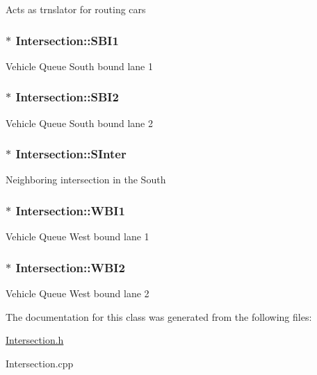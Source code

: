 Acts as trnslator for routing cars \hypertarget{class_intersection_a0f60a7d5b4911fbc309ddecdab4a75e7}{
\subsubsection[{S\-B\-I1}]{$\ast$ Intersection\-::\-S\-B\-I1}}\label{class_intersection_a0f60a7d5b4911fbc309ddecdab4a75e7}
Vehicle Queue South bound lane 1 \hypertarget{class_intersection_a172b271e9434b824c4722b1589d77f55}{
\subsubsection[{S\-B\-I2}]{$\ast$ Intersection\-::\-S\-B\-I2}}\label{class_intersection_a172b271e9434b824c4722b1589d77f55}
Vehicle Queue South bound lane 2 \hypertarget{class_intersection_af6cfb23dbc2ad5b1d90752247dd07acf}{
\subsubsection[{S\-Inter}]{$\ast$ Intersection\-::\-S\-Inter}}\label{class_intersection_af6cfb23dbc2ad5b1d90752247dd07acf}
Neighboring intersection in the South \hypertarget{class_intersection_a7d4afb62f4051e6f25c0195de1d66442}{
\subsubsection[{W\-B\-I1}]{$\ast$ Intersection\-::\-W\-B\-I1}}\label{class_intersection_a7d4afb62f4051e6f25c0195de1d66442}
Vehicle Queue West bound lane 1 \hypertarget{class_intersection_a7f4c7a9c2344827a24aaa52955e56fac}{
\subsubsection[{W\-B\-I2}]{$\ast$ Intersection\-::\-W\-B\-I2}}\label{class_intersection_a7f4c7a9c2344827a24aaa52955e56fac}
Vehicle Queue West bound lane 2 

The documentation for this class was generated from the following files\-:\begin{DoxyCompactItemize}
\item 
\hyperlink{_intersection_8h}{Intersection.\-h}\item 
Intersection.\-cpp\end{DoxyCompactItemize}
